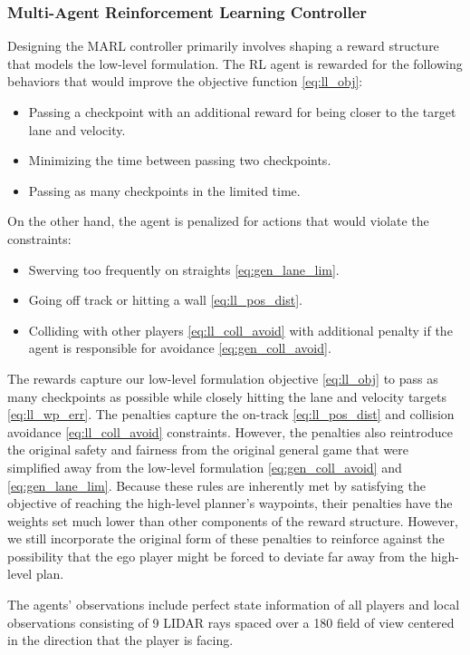\subsubsection{Multi-Agent Reinforcement Learning Controller}
Designing the MARL controller primarily involves shaping a reward structure that models the low-level formulation. The RL agent is rewarded for the following behaviors that would improve the objective function \eqref{eq:ll_obj}:
\begin{itemize}
    \item Passing a checkpoint with an additional reward for being closer to the target lane and velocity.
    \item Minimizing the time between passing two checkpoints.
    \item Passing as many checkpoints in the limited time.
\end{itemize}
On the other hand, the agent is penalized for actions that would violate the constraints:
\begin{itemize}
    \item Swerving too frequently on straights \eqref{eq:gen_lane_lim}.
    \item Going off track or hitting a wall \eqref{eq:ll_pos_dist}.
    \item Colliding with other players \eqref{eq:ll_coll_avoid} with additional penalty if the agent is responsible for avoidance \eqref{eq:gen_coll_avoid}. 
\end{itemize}

The rewards capture our low-level formulation objective \eqref{eq:ll_obj} to pass as many checkpoints as possible while closely hitting the lane and velocity targets \eqref{eq:ll_wp_err}. The penalties capture the on-track \eqref{eq:ll_pos_dist} and collision avoidance \eqref{eq:ll_coll_avoid} constraints. However, the penalties also reintroduce the original safety and fairness from the original general game that were simplified away from the low-level formulation \eqref{eq:gen_coll_avoid} and \eqref{eq:gen_lane_lim}. Because these rules are inherently met by satisfying the objective of reaching the high-level planner's waypoints, their penalties have the weights set much lower than other components of the reward structure. However, we still incorporate the original form of these penalties to reinforce against the possibility that the ego player might be forced to deviate far away from the high-level plan.

The agents' observations include perfect state information of all players and local observations consisting of 9 LIDAR rays spaced over a 180\textdegree{} field of view centered in the direction that the player is facing.

